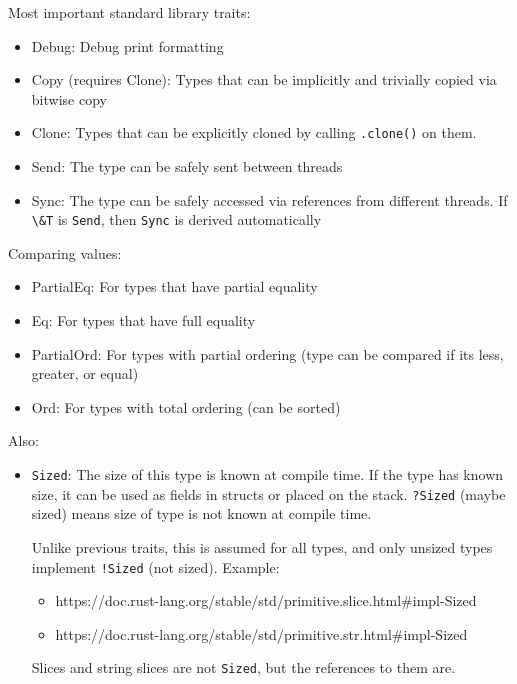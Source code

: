 \documentclass[
  9pt,
  ignorenonframetext,
]{beamer}
\newcommand{\passthrough}[1]{#1}
\providecommand{\tightlist}{%
  \setlength{\itemsep}{0pt}\setlength{\parskip}{0pt}}
\begin{document}
\begin{frame}[fragile]
\begin{block}{Most important standard library traits:}
\protect\hypertarget{most-important-standard-library-traits}{}
\begin{itemize}
\tightlist
\item
  Debug: Debug print formatting
\item
  Copy (requires Clone): Types that can be implicitly and trivially
  copied via bitwise copy
\item
  Clone: Types that can be explicitly cloned by calling
  \passthrough{\lstinline!.clone()!} on them.
\item
  Send: The type can be safely sent between threads
\item
  Sync: The type can be safely accessed via references from different
  threads. If \passthrough{\lstinline!\&T!} is
  \passthrough{\lstinline!Send!}, then \passthrough{\lstinline!Sync!} is
  derived automatically
\end{itemize}
\end{block}
\end{frame}

\begin{frame}
Comparing values:

\begin{itemize}
\tightlist
\item
  PartialEq: For types that have partial equality
\item
  Eq: For types that have full equality
\item
  PartialOrd: For types with partial ordering (type can be compared if
  its less, greater, or equal)
\item
  Ord: For types with total ordering (can be sorted)
\end{itemize}
\end{frame}

\begin{frame}[fragile]
Also:

\begin{itemize}
\item
  \passthrough{\lstinline!Sized!}: The size of this type is known at
  compile time. If the type has known size, it can be used as fields in
  structs or placed on the stack. \passthrough{\lstinline!?Sized!}
  (maybe sized) means size of type is not known at compile time.

  Unlike previous traits, this is assumed for all types, and only
  unsized types implement \passthrough{\lstinline"!Sized"} (not sized).
  Example:

  \begin{itemize}
  \tightlist
  \item
    https://doc.rust-lang.org/stable/std/primitive.slice.html\#impl-Sized
  \item
    https://doc.rust-lang.org/stable/std/primitive.str.html\#impl-Sized
  \end{itemize}

  Slices and string slices are not \passthrough{\lstinline!Sized!}, but
  the references to them are.
\end{itemize}
\end{frame}
\end{document}
